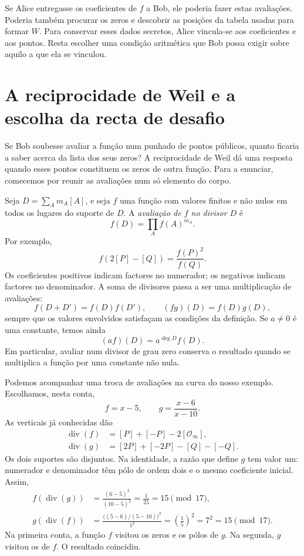 

Se Alice entregasse os coeficientes de \(f\) a Bob, ele poderia
fazer estas avaliações. Poderia também procurar os zeros e descobrir
as posições da tabela usadas para formar \(W\). Para conservar esses
dados secretos, Alice vincula-se aos coeficientes e aos pontos. Resta
escolher uma condição aritmética que Bob possa exigir sobre aquilo
a que ela se vinculou.

\section{A reciprocidade de Weil e a escolha da recta de desafio}
\label{sec:divisors-evaluation}

Se Bob soubesse avaliar a função num punhado de pontos públicos,
quanto ficaria a saber acerca da lista dos seus zeros? A reciprocidade
de Weil dá uma resposta quando esses pontos constituem os zeros de
outra função. Para a enunciar, comecemos por reunir as avaliações
num só elemento do corpo.

Seja \(D=\sum_A m_A[A]\), e seja \(f\) uma função com valores
finitos e não nulos em todos os lugares do suporte de \(D\).
A \emph{avaliação de \(f\) no divisor \(D\)} é
\begin{equation}
 f(D)=\prod_A f(A)^{m_A}.
 \label{eq:divisors-evaluation}
\end{equation}
Por exemplo,
\[
 f(2[P]-[Q])=\frac{f(P)^2}{f(Q)}.
\]
Os coeficientes positivos indicam factores no numerador; os negativos
indicam factores no denominador. A soma de divisores passa a ser uma
multiplicação de avaliações:
\[
 f(D+D')=f(D)f(D'),\qquad (fg)(D)=f(D)g(D),
\]
sempre que os valores envolvidos satisfaçam as condições da definição.
Se \(a\ne0\) é uma constante, temos ainda
\[
 (af)(D)=a^{\deg D}f(D).
\]
Em particular, avaliar num divisor de grau zero conserva o resultado
quando se multiplica a função por uma constante não nula.

Podemos acompanhar uma troca de avaliações na curva do nosso exemplo.
Escolhamos, nesta conta,
\[
 f=x-5,\qquad g=\frac{x-6}{x-10}.
\]
As verticais já conhecidas dão
\begin{align*}
 \operatorname{div}(f)&=[P]+[-P]-2[\mathcal O_\infty],\\
 \operatorname{div}(g)&=[2P]+[-2P]-[Q]-[-Q].
\end{align*}
Os dois suportes são disjuntos. Na identidade, a razão que define
\(g\) tem valor um: numerador e denominador têm pólo de ordem dois
e o mesmo coeficiente inicial. Assim,
\begin{align*}
 f(\operatorname{div}(g))
 &=\frac{(6-5)^2}{(10-5)^2}
   =\frac1{25}=15\pmod {17},\\
 g(\operatorname{div}(f))
 &=\frac{\bigl((5-6)/(5-10)\bigr)^2}{1^2}
   =\left(\frac15\right)^2=7^2=15\pmod {17}.
\end{align*}
Na primeira conta, a função \(f\) visitou os zeros e os pólos de
\(g\). Na segunda, \(g\) visitou os de \(f\). O resultado
coincidiu.

